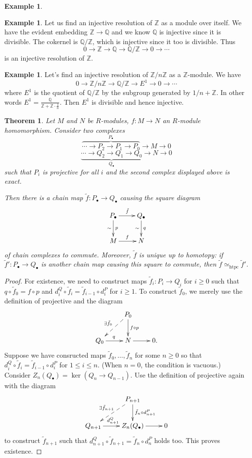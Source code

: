 \documentclass{amsart}[12pt]
\def\htpy{\simeq_{\mathrm{htpc}}}
\def\ker{\operatorname{ker}}
\newcommand{\Q}{\mathbb{Q}}
\newcommand{\Z}{\mathbb{Z}}
\numberwithin{equation}{section}
\theoremstyle{plain} %
\newtheorem{thm}[equation]{Theorem}
\theoremstyle{definition}
\newtheorem{ex}[equation]{Example}
\theoremstyle{remark}
\begin{document}
\begin{ex}
\begin{ex} Let us  find an injective resolution of $\Z$ as a module over itself. We have the evident embedding $\Z \to \Q$ and we know $\Q$ is injective since
  it is divisible. The cokernel is $\Q/\Z$, which is injective since it too is divisible. Thus
$$
0 \to \Z \to \Q \to \Q/\Z \to 0 \to \cdots
$$
is an injective resolution of $\Z$.
\end{ex}


\begin{ex} 
Let's find an injective resolution of $\Z/n\Z$ as a $\Z$-module. We have
$$
0 \to \Z/n\Z \to \Q/\Z \to E^1 \to 0 \to \cdots
$$
where $E^1$ is the quotient of $\Q/\Z$ by the subgroup generated by $1/n + \Z$. In other words
$E^1 = \frac{\Q}{\Z + \Z \cdot \frac{1}{n}}$. Then $E^1$ is divisible and hence injective. 
\end{ex}




\begin{thm} \label{thm121b} Let $M$ and $N$ be $R$-modules, $f: M \to N$ an $R$-module homomorphism. 
Consider two complexes
\[
\overbrace{\cdots \to P_2 \to P_1\to P_0}^{P_\bullet} \to M\to 0
\]
\[
\underbrace{\cdots \to Q_2 \to Q_1\to Q_0}_{Q_\bullet} \to N\to 0
\]
such that $P_i$ is projective for all $i$ and the second complex displayed above is exact.
  
    Then there is
a chain map $\tilde{f}: P_\bullet \to Q_\bullet$ causing the square diagram 
$$
\xymatrix{
  P_\bullet \ar[d]^p_\sim \ar[r]^{\tilde{f}} &  Q_\bullet \ar[d]^q_\sim \\  
M \ar[r]^f & N \\
}
$$
of chain complexes to commute. Moreover, $\tilde{f}$ is unique up to homotopy: if $\tilde{f}': P_\bullet \to Q_\bullet$ is another
chain map causing this square to commute, then $\tilde{f} \htpy \tilde{f}'$. 
\end{thm}

\def\tf{\tilde{f}}

\begin{proof} For existence,  we need to construct maps $\tf_i: P_i \to Q_i$ for $i   \geq 0$ such that $q \circ \tf_0 = f \circ p$
and $d^Q_i \circ \tf_i = \tf_{i-1} \circ d^P_i$ for $i \geq 1$. To construct $\tf_0$, we merely use the definition of projective and the diagram
$$
\xymatrix{
& P_0 \ar[d]^{f \circ p}   \ar@{-->}[dl]_{\exists \tf_0} \\
Q_0 \ar[r]^q & N \ar[r] & 0. \\
}
$$
Suppose we have consructed maps $\tf_0, \dots, \tf_n$ for some $n \geq 0$  so that
 $d^Q_i \circ \tf_i = \tf_{i-1} \circ d^P_i$ for $1 \leq i \leq n$. (When $n = 0$, the condition is vacuous.)
Consider $Z_{n}(Q_\bullet)= \ker(Q_n \to Q_{n-1})$.  Use the definition of projective again with the diagram
$$
\xymatrix{
& P_{n+1} \ar[d]^{\tf_n \circ d^P_{n+1}}   \ar@{-->}[dl]_{\exists \tf_{n+1}} \\
Q_{n+1} \ar[r]^{d^Q_{n+1}} & Z_{n}(Q_\bullet) \ar[r] & 0 \\
}
$$
to construct $\tf_{n+1}$ such that  $d^Q_{n+1} \circ \tf_{n+1} = \tf_{n} \circ d^P_n$ holds too.  This proves existence. 





\end{proof}
\end{ex}
\end{document}
